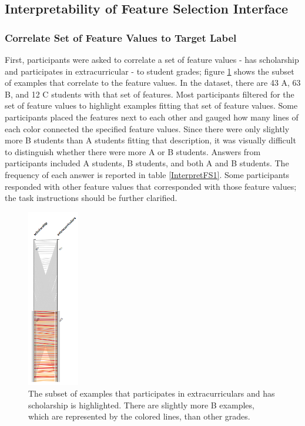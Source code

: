 \subsection { Interpretability of Feature Selection Interface }
\subsubsection { Correlate Set of Feature Values to Target Label}
First, participants were asked to correlate a set of feature values - has scholarship and participates in extracurricular - to student grades; figure \ref{featureselectiontask1} shows the subset of examples that correlate to the feature values. In the dataset, there are 43 A, 63 B, and 12 C students with that set of features. Most participants filtered for the set of feature values to highlight examples fitting that set of feature values. Some participants placed the features next to each other and gauged how many lines of each color connected the specified feature values. Since there were only slightly more B students than A students fitting that description, it was visually difficult to distinguish whether there were more A or B students. Answers from participants included A students, B students, and both A and B students. The frequency of each answer is reported in table \ref{InterpretFS1}. Some participants responded with other feature values that corresponded with those feature values; the task instructions should be further clarified.

\begin{figure}
\centering
\includegraphics[width=0.2\textwidth]{scholarshipandextracurriculars}
\caption{ The subset of examples that participates in extracurriculars and has scholarship is highlighted. There are slightly more B examples, which are represented by the colored lines, than other grades. }
\label{featureselectiontask1}
\end{figure}

